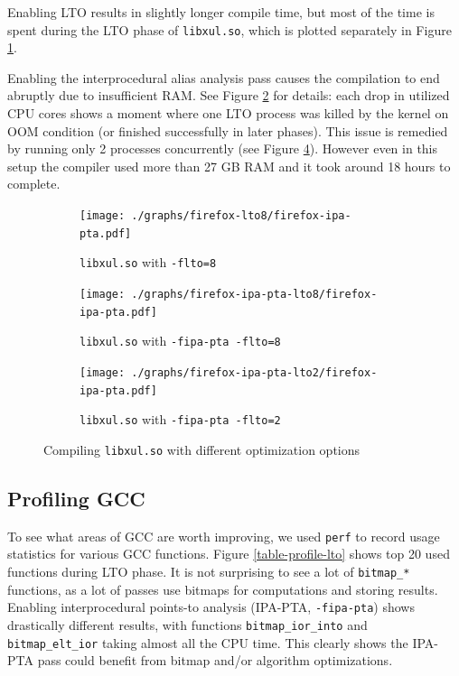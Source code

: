 Enabling LTO results in slightly longer compile time, but most of the time is
spent during the LTO phase of {\tt libxul.so}, which is plotted separately in Figure
\ref{figure-firefox-lto8}.

Enabling the interprocedural alias analysis pass causes the compilation to end
abruptly due to insufficient RAM.  See Figure \ref{figure-firefox-ipa-pta-lto8}
for details: each drop in utilized CPU cores shows a moment where one LTO
process was killed by the kernel on OOM condition (or finished successfully in
later phases). This issue is remedied by running only 2 processes concurrently
(see Figure \ref{figure-firefox-ipa-pta-lto2}).  However even in this setup the
compiler used more than 27 GB RAM and it took around 18 hours to complete.

\begin{figure}
\begin{subfigure}[b]{\textwidth}
	\label{figure-firefox-lto8}
	\centering
	\texttt{[image: ./graphs/firefox-lto8/firefox-ipa-pta.pdf]}
	\caption{{\tt libxul.so} with {\tt -flto=8}}
\end{subfigure}
\begin{subfigure}[b]{\textwidth}
	\label{figure-firefox-ipa-pta-lto8}
	\centering
	\texttt{[image: ./graphs/firefox-ipa-pta-lto8/firefox-ipa-pta.pdf]}
	\caption{{\tt libxul.so} with {\tt -fipa-pta -flto=8}}
\end{subfigure}
\begin{subfigure}[b]{\textwidth}
	\label{figure-firefox-ipa-pta-lto2}
	\centering
	\texttt{[image: ./graphs/firefox-ipa-pta-lto2/firefox-ipa-pta.pdf]}
	\caption{{\tt libxul.so} with {\tt -fipa-pta -flto=2}}
\end{subfigure}
\caption{Compiling {\tt libxul.so} with different optimization options}
\end{figure}

\subsection{Profiling GCC}

To see what areas of GCC are worth improving, we used {\tt perf}  to record usage
statistics for various GCC functions. Figure \ref{table-profile-lto} shows top 20 used
functions during LTO phase. It is not surprising to see a lot of {\tt bitmap\_*}
functions, as a lot of passes use bitmaps for computations and storing results.
Enabling interprocedural points-to analysis (IPA-PTA, {\tt -fipa-pta}) shows drastically
different results, with functions {\tt bitmap\_ior\_into} and {\tt
bitmap\_elt\_ior} taking almost all the CPU time. This clearly shows the IPA-PTA
pass could benefit from bitmap and/or algorithm optimizations.

